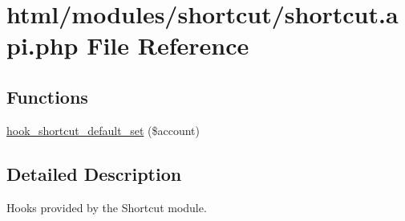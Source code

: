 \hypertarget{shortcut_8api_8php}{
\section{html/modules/shortcut/shortcut.api.php File Reference}
\label{shortcut_8api_8php}
}
\subsection*{Functions}
\begin{DoxyCompactItemize}
\item 
\hyperlink{group__hooks_ga5fe90af5e2617387b8b14dc51fc356ab}{hook\_\-shortcut\_\-default\_\-set} (\$account)
\end{DoxyCompactItemize}


\subsection{Detailed Description}
Hooks provided by the Shortcut module. 